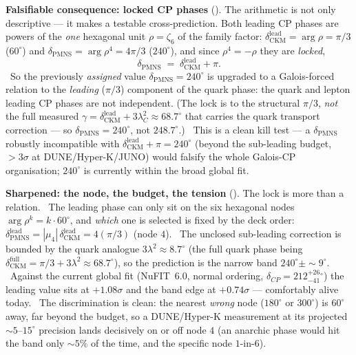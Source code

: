 \documentclass[11pt,a4paper]{article}
\begin{document}
\par\smallskip\noindent\textbf{Falsifiable consequence: locked CP phases}
(). The arithmetic is not only descriptive --- it makes a testable
cross-prediction. Both leading CP phases are powers of the \emph{one} hexagonal unit $\rho=\zeta_6$ of the family
factor: $\delta_{\mathrm{CKM}}^{\mathrm{lead}}=\arg\rho=\pi/3$ ($60^\circ$) and
$\delta_{\mathrm{PMNS}}=\arg\rho^{4}=4\pi/3$ ($240^\circ$), and since $\rho^4=-\rho$ they are \emph{locked},
\[
  \delta_{\mathrm{PMNS}}\;=\;\delta_{\mathrm{CKM}}^{\mathrm{lead}}+\pi .
\]
\mC\ So the previously \emph{assigned} value $\delta_{\mathrm{PMNS}}=240^\circ$ is upgraded to a Galois-forced
relation to the \emph{leading} ($\pi/3$) component of the quark phase: the quark and lepton leading CP phases are
not independent. (The lock is to the structural $\pi/3$, \emph{not} the full measured
$\gamma=\delta_{\mathrm{CKM}}^{\mathrm{lead}}+3\lambda_C^2\approx68.7^\circ$ that carries the quark transport
correction --- so $\delta_{\mathrm{PMNS}}=240^\circ$, not $248.7^\circ$.) \mX\ This is
a clean kill test --- a $\delta_{\mathrm{PMNS}}$ robustly incompatible with
$\delta_{\mathrm{CKM}}^{\mathrm{lead}}+\pi=240^\circ$ (beyond the sub-leading budget, $>3\sigma$ at
DUNE/Hyper-K/JUNO) would falsify the whole Galois-CP organisation; $240^\circ$ is currently within the broad
global fit.

\par\smallskip\noindent\textbf{Sharpened: the node, the budget, the tension}
(). The lock is more than a relation. \mE\ The leading phase can only sit on the
six hexagonal nodes $\arg\rho^k=k\cdot60^\circ$, and \emph{which} one is selected is fixed by the deck order:
$\delta_{\mathrm{PMNS}}^{\mathrm{lead}}=|\mu_4|\,\delta_{\mathrm{CKM}}^{\mathrm{lead}}=4(\pi/3)$ (node $4$). \mC\ The
unclosed sub-leading correction is bounded by the quark analogue $3\lambda^2\approx8.7^\circ$ (the full quark phase
being $\delta_{\mathrm{CKM}}^{\mathrm{full}}=\pi/3+3\lambda^2\approx68.7^\circ$), so the prediction is the narrow band
$240^\circ\pm\sim9^\circ$. \mC\ Against the current global fit (NuFIT~6.0, normal ordering,
$\delta_{CP}=212^{+26}_{-41}{}^\circ$) the leading value sits at $+1.08\sigma$ and the band edge at $+0.74\sigma$
--- comfortably alive today. \mX\ The discrimination is clean: the nearest \emph{wrong} node ($180^\circ$ or
$300^\circ$) is $60^\circ$ away, far beyond the budget, so a DUNE/Hyper-K measurement at its projected $\sim5$--$15^\circ$
precision lands decisively on or off node $4$ (an anarchic phase would hit the band only $\sim5\%$ of the time, and
the specific node $1$-in-$6$).
\end{document}
